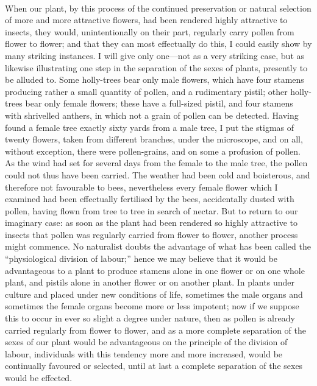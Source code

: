 \documentclass{article}
\begin{document}
\\
When our plant, by this process of the continued preservation or natural selection of more and more attractive flowers, had been rendered highly attractive to insects, they would, unintentionally on their part, regularly carry pollen from flower to flower; and that they can most effectually do this, I could easily show by many striking instances. I will give only one—not as a very striking case, but as likewise illustrating one step in the separation of the sexes of plants, presently to be alluded to. Some holly-trees bear only male flowers, which have four stamens producing rather a small quantity of pollen, and a rudimentary pistil; other holly-trees bear only female flowers; these have a full-sized pistil, and four stamens with shrivelled anthers, in which not a grain of pollen can be detected. Having found a female tree exactly sixty yards from a male tree, I put the stigmas of twenty flowers, taken from different branches, under the microscope, and on all, without exception, there were pollen-grains, and on some a profusion of pollen. As the wind had set for several days from the female to the male tree, the pollen could not thus have been carried. The weather had been cold and boisterous, and therefore not favourable to bees, nevertheless every female flower which I examined had been effectually fertilised by the bees, accidentally dusted with pollen, having flown from tree to tree in search of nectar. But to return to our imaginary case: as soon as the plant had been rendered so highly attractive to insects that pollen was regularly carried from flower to flower, another process might commence. No naturalist doubts the advantage of what has been called the “physiological division of labour;” hence we may believe that it would be advantageous to a plant to produce stamens alone in one flower or on one whole plant, and pistils alone in another flower or on another plant. In plants under culture and placed under new conditions of life, sometimes the male organs and sometimes the female organs become more or less impotent; now if we suppose this to occur in ever so slight a degree under nature, then as pollen is already carried regularly from flower to flower, and as a more complete separation of the sexes of our plant would be advantageous on the principle of the division of labour, individuals with this tendency more and more increased, would be continually favoured or selected, until at last a complete separation of the sexes would be effected.\\
\end{document}
